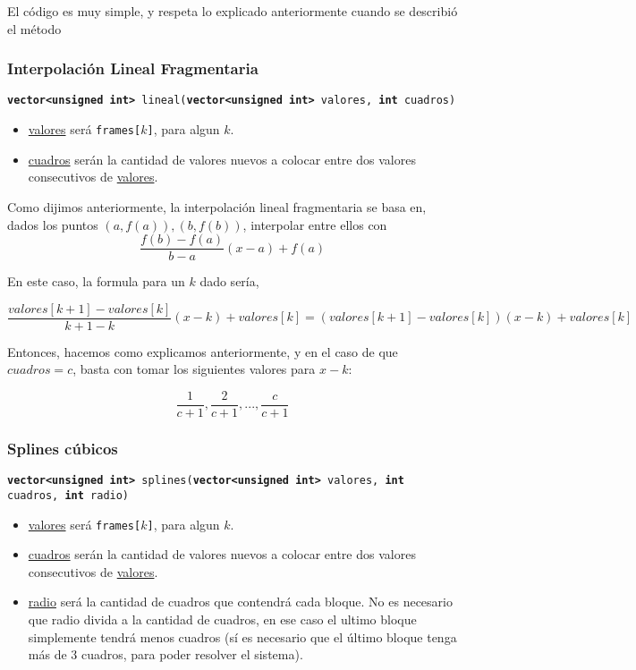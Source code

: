 El código es muy simple, y respeta lo explicado anteriormente cuando se describió el método


\subsubsection{Interpolación Lineal Fragmentaria}
\texttt{\textbf{vector<unsigned int>} lineal(\textbf{vector<unsigned int>} valores, \textbf{int} cuadros)}

\begin{itemize}
    \item  \underline{valores} será \texttt{frames[$k$]}, para algun $k$.
    \item \underline{cuadros} serán la cantidad de valores nuevos a colocar entre dos valores consecutivos de \underline{valores}.
\end{itemize}


Como dijimos anteriormente, la interpolación lineal fragmentaria se basa en, dados los puntos $(a,f(a)), (b,f(b))$, interpolar entre ellos con \[\frac{f(b)-f(a)}{b-a} (x-a) + f(a)\]

En este caso, la formula para un $k$ dado sería,

\[\frac{valores[k+1] - valores[k]}{k+1 - k} (x - k) + valores[k] = (valores[k+1] - valores[k]) (x - k) + valores[k] \]

Entonces, hacemos como explicamos anteriormente, y en el caso de que $cuadros = c$, basta con tomar los siguientes valores para $x - k$:

\[\frac1{c+1}, \frac2{c+1}, ..., \frac{c}{c+1}\]

\subsubsection{Splines cúbicos}

\texttt{\textbf{vector<unsigned int>} splines(\textbf{vector<unsigned int>} valores, \textbf{int} cuadros, \textbf{int} radio)}

\begin{itemize}
    \item  \underline{valores} será \texttt{frames[$k$]}, para algun $k$.
    \item \underline{cuadros} serán la cantidad de valores nuevos a colocar entre dos valores consecutivos de \underline{valores}.
    \item \underline{radio} será la cantidad de cuadros que contendrá cada bloque. No es necesario que radio divida a la cantidad de cuadros, en ese caso el ultimo bloque simplemente tendrá menos cuadros (sí es necesario que el último bloque tenga más de 3 cuadros, para poder resolver el sistema).
\end{itemize}

